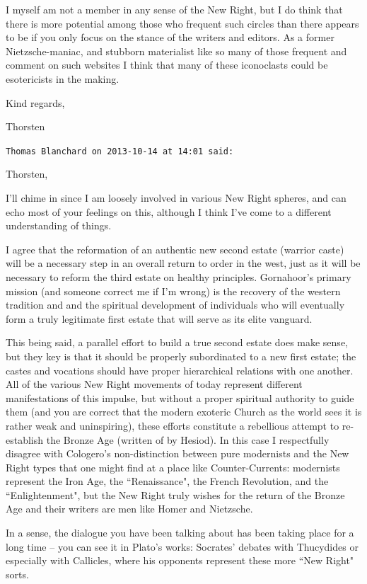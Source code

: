 \begin{footnotesize}
\begin{sffamily}
I myself am not a member in any sense of the New Right, but I do think that there is more potential among those who frequent such circles than there appears to be if you only focus on the stance of the writers and editors. As a former Nietzsche-maniac, and stubborn materialist like so many of those frequent and comment on such websites I think that many of these iconoclasts could be esotericists in the making.

Kind regards,

Thorsten


\hfill

\texttt{Thomas Blanchard on 2013-10-14 at 14:01 said: }

Thorsten,

I'll chime in since I am loosely involved in various New Right spheres, and can echo most of your feelings on this, although I think I've come to a different understanding of things.

I agree that the reformation of an authentic new second estate (warrior caste) will be a necessary step in an overall return to order in the west, just as it will be necessary to reform the third estate on healthy principles. Gornahoor's primary mission (and someone correct me if I'm wrong) is the recovery of the western tradition and and the spiritual development of individuals who will eventually form a truly legitimate first estate that will serve as its elite vanguard.

This being said, a parallel effort to build a true second estate does make sense, but they key is that it should be properly subordinated to a new first estate; the castes and vocations should have proper hierarchical relations with one another. All of the various New Right movements of today represent different manifestations of this impulse, but without a proper spiritual authority to guide them (and you are correct that the modern exoteric Church as the world sees it is rather weak and uninspiring), these efforts constitute a rebellious attempt to re-establish the Bronze Age (written of by Hesiod). In this case I respectfully disagree with Cologero's non-distinction between pure modernists and the New Right types that one might find at a place like Counter-Currents: modernists represent the Iron Age, the ``Renaissance", the French Revolution, and the ``Enlightenment", but the New Right truly wishes for the return of the Bronze Age and their writers are men like Homer and Nietzsche.

In a sense, the dialogue you have been talking about has been taking place for a long time – you can see it in Plato's works: Socrates' debates with Thucydides or especially with Callicles, where his opponents represent these more ``New Right" sorts.


\end{sffamily}
\end{footnotesize}
